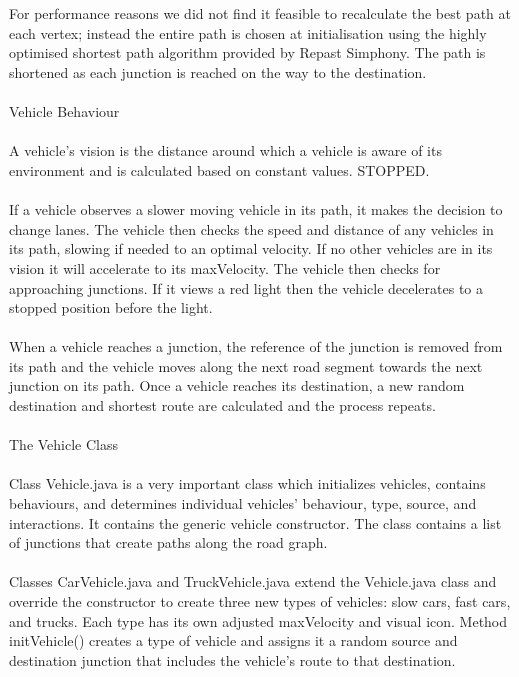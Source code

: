 \documentclass[11pt]{article}
\begin{document}
\\ \\
For performance reasons we did not find it feasible to recalculate the best path at each vertex; instead the entire path is chosen at initialisation using the highly optimised shortest path algorithm provided by Repast Simphony. The path is shortened as each junction is reached on the way to the destination. 
\\ \\
Vehicle Behaviour
\\ \\
A vehicle’s vision is the distance around which a vehicle is aware of its environment and is calculated based on constant values. STOPPED.
\\ \\
If a vehicle observes a slower moving vehicle in its path, it makes the decision to change lanes. The vehicle then checks the speed and distance of any vehicles in its path, slowing if needed to an optimal velocity. If no other vehicles are in its vision it will accelerate to its maxVelocity. The vehicle then checks for approaching junctions. If it views a red light then the vehicle decelerates to a stopped position before the light. 
\\ \\
When a vehicle reaches a junction, the reference of the junction is removed from its path and the vehicle moves along the next road segment towards the next junction on its path. Once a vehicle reaches its destination, a new random destination and shortest route are calculated and the process repeats.
\\ \\
The Vehicle Class
\\ \\
Class Vehicle.java is a very important class which initializes vehicles, contains behaviours, and determines individual vehicles’ behaviour, type, source, and interactions. It contains the generic vehicle constructor. The class contains a list of junctions that create paths along the road graph. 
\\ \\
Classes CarVehicle.java and TruckVehicle.java extend the Vehicle.java class and override the constructor to create three new types of vehicles: slow cars, fast cars, and trucks. Each type has its own adjusted maxVelocity and visual icon. 
Method initVehicle() creates a type of vehicle and assigns it a random source and destination junction that includes the vehicle’s route to that destination. 
\end{document}
